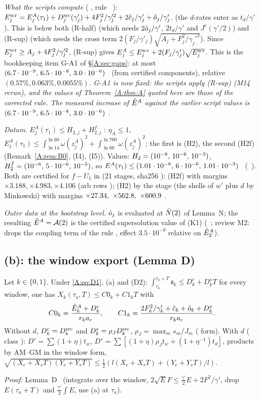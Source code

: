 \documentclass[11pt]{article}
\begin{document}
\noindent\emph{What the scripts compute} ( , rule \SA\ ): $E^{\rm scr}_j=E^A_j(\tau_1)+D^{\rm src}_j(\gamma'_j)+4F_j^2/\gamma_j'^2+2\hat c_j/\gamma'_j+\hat o_j/\gamma'_j$. (the $d$-rates enter as $t_d/\gamma'$). This is below both (R-half) (which needs $2\hat o_j/\gamma'$, $2t_d/\gamma'$ and $J^e(\gamma'/2)$) and (R-sup) (which needs the cross term $2(F_j/\gamma'_j)\sqrt{A_j+F_j^2/\gamma_j'^2}$). Since $E^{\rm scr}_j\ge A_j+4F_j^2/\gamma_j'^2$, (R-sup) gives $E^A_j\le E^{\rm scr}_j+2(F_j/\gamma'_j)\sqrt{E^{\rm scr}_j}$. This is the bookkeeping item G-A1 of \S\ref{A:sec:gaps}: at most $(6.7\cdot10^{-9},\,6.5\cdot10^{-8},\,3.0\cdot10^{-6})$ \tE\ (from certified components), relative $(0.57\%,0.063\%,0.0055\%)$. \emph{G-A1 is now fixed: the scripts apply (R-sup) (M14 rerun), and the values of Theorem~\ref{A:thm:A} quoted here are those of the corrected rule. The measured increase of $\hat E^A$ against the earlier script values is $(6.7\cdot10^{-9},\,6.5\cdot10^{-8},\,3.0\cdot10^{-6})$ \tE.}

\emph{Datum.} $E^A_j(\tau_1)\le H_{2,j}+H^f_{2,j}$ \tP: $\eta_A\le1$, $E^A_j(\tau_1)\le\int_{\ln14}^{\ln60}\omega(z^A_j)^2+\int_{\ln60}^{\ln700}\omega(z^A_j)^2$; the first is (H2), the second (H2f) (Remark~\ref{A:rem:B0}, (I4), (I5)). Values: $H_2=(10^{-8},\,10^{-6},\,10^{-3})$, $H^f_2=(10^{-6},\,5\cdot10^{-6},\,10^{-5})$, so $E^A(\tau_1)\le(1.01\cdot10^{-6},\,6\cdot10^{-6},\,1.01\cdot10^{-3})$ \tH\ (\SA\ ). Both are certified for $f-U_1$ in  (21 stages, sha256 ): (H2f) with margins $\times3.188,\times4.983,\times4.106$ (arb rows ); (H2) by the stage  (the shells of $w'$ plus $d$ by Minkowski) with margins $\times27.34,\ \times562.8,\ \times600.9$ \tC\tB.

\emph{Outer data at the bootstrap level.} $\hat o_j$ is evaluated at $\bar N(2)$ of Lemma~N; the resulting $\hat E^A=\mathcal A(2)$ is the certified supersolution value of  (K1) (\SU\ ; review M2:  drops the coupling term of the rule , effect $3.5\cdot10^{-9}$ relative on $\hat E^A_2$).

\subsection{(b): the window export (Lemma D)}
\begin{lemma}\label{A:lem:D}
Let $k\in\{0,1\}$. Under \eqref{A:eq:D1}, (a) and \textup{(D2)}: $\int_{\tau_a}^{\tau_a+T}\mathfrak s_k\le D^{c}_k+D^{s}_kT$ for every window, one has $X_k(\tau_a,T)\le C0_k+C1_kT$ with
\[
C0_k=\frac{\hat E^A_k+D^{c}_k}{r_ka_c},\qquad C1_k=\frac{2F_k^2/\gamma'_k+\hat c_k+\hat o_k+D^{s}_k}{r_ka_c}.
\]
Without $d$, $D^c_k=D^{\rm src}_k$ and $D^s_k=\rho_JD^{\rm src}_k$, $\rho_J=\max_ms_m/J_m$ ( form). With $d$ ( class ): $D^c=\sum(1+\eta)t_w$, $D^s=\sum[(1+\eta)\rho_Jt_w+(1+\eta^{-1})t_d]$, products by AM--GM in the window form, $\sqrt{(X_c+X_sT)(Y_c+Y_sT)}\le\frac12(l(X_c+X_sT)+(Y_c+Y_sT)/l)$.
\end{lemma}
\noindent\emph{Proof:}  Lemma~D \tP\ (integrate over the window, $2\sqrt EF\le\frac{\gamma'}2E+2F^2/\gamma'$, drop $E(\tau_a+T)$ and $\frac{\gamma'}2\int E$, use (a) at $\tau_a$).
\end{document}
